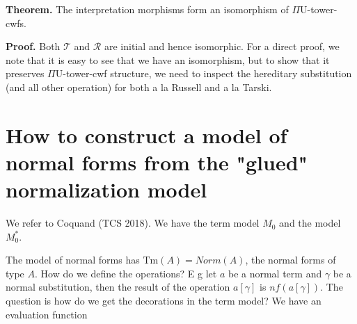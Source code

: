 \documentclass{lmcs}
\def\UU{\mathrm{U}}
\def\Tm{\mathrm{Tm}}
\def\T{\mathcal{T}}
\def\R{\mathcal{R}}
\begin{document}
{\bf Theorem.} The interpretation morphisms form an isomorphism of $\Pi\UU$-tower-cwfs.

{\bf Proof.} Both $\T$ and $\R$ are initial and hence isomorphic. For a direct proof, we note that it is easy to see that we have an isomorphism, but to show that it preserves $\Pi\UU$-tower-cwf structure, we need to inspect the hereditary substitution (and all other operation) for both a la Russell and a la Tarski.

\section{How to construct a model of normal forms from the "glued" normalization model}

We refer to Coquand (TCS 2018). We have the term model $M_0$ and the model $M^*_0$.

The model of normal forms has $\Tm(A) = Norm(A)$, the normal forms of type $A$. How do we define the operations? E g let $a$ be a normal term and $\gamma$ be a normal substitution, then the result of the operation $a[\gamma]$ is $nf(a[\gamma])$. The question is how do we get the decorations in the term model? We have an evaluation function



\end{document}

